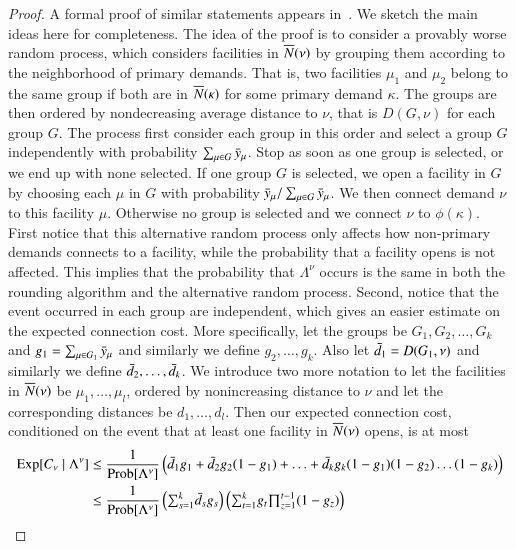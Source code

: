 \begin{proof}
  A formal proof of similar statements appears in~\cite{ChudakS04,
    ByrkaA10}. We sketch the main ideas here for completeness. The
  idea of the proof is to consider a provably worse random process,
  which considers facilities in ${\overline{N}}(\nu)$ by grouping them
  according to the neighborhood of primary demands. That is, two
  facilities $\mu_1$ and $\mu_2$ belong to the same group if both are
  in ${\overline{N}}(\kappa)$ for some primary demand $\kappa$. The groups are
  then ordered by nondecreasing average distance to $\nu$, that is
  $D(G,\nu)$ for each group $G$. The process first consider each group
  in this order and select a group $G$ independently with probability
  $\sum_{\mu\in G}{\bar y}_{\mu}$. Stop as soon as one group is selected,
  or we end up with none selected. If one group $G$ is selected, we
  open a facility in $G$ by choosing each $\mu$ in $G$ with
  probability ${\bar y}_{\mu}/\sum_{\mu\in G} {\bar y}_{\mu}$. We then
  connect demand $\nu$ to this facility $\mu$. Otherwise no group is
  selected and we connect $\nu$ to $\phi(\kappa)$. First notice that
  this alternative random process only affects how non-primary demands
  connects to a facility, while the probability that a facility opens
  is not affected. This implies that the probability that
  $\Lambda^\nu$ occurs is the same in both the rounding algorithm and
  the alternative random process. Second, notice that the event
  occurred in each group are independent, which gives an easier
  estimate on the expected connection cost. More specifically, let the
  groups be $G_1, G_2, \ldots, G_k$ and $g_1 = \sum_{\mu \in G_1}
  {\bar y}_{\mu}$ and similarly we define $g_2,\ldots,g_k$. Also let
  ${\bar d}_1 = D(G_1, \nu)$ and similarly we define ${\bar d}_2, \ldots,
  {\bar d}_k$. We introduce two more notation to let the facilities in
  ${\overline{N}}(\nu)$ be $\mu_1, \ldots, \mu_l$, ordered by nonincreasing
  distance to $\nu$ and let the corresponding distances be $d_1,
  \ldots, d_l$. Then our expected connection cost, conditioned on the
  event that at least one facility in ${\overline{N}}(\nu)$ opens, is at most
\begin{align*}
  \Exp[C_\nu \mid \Lambda^\nu] &\leq \frac{1}{\Prob[\Lambda^\nu]}
  \left( \bard_1 g_1 + \bard_2 g_2 (1-g_1) + \ldots + \bard_k g_k
    (1-g_1) (1-g_2) \ldots (1-g_k) \right)
  \\
  &\leq \frac{1}{\Prob[\Lambda^\nu]} \left(\textstyle{\sum_{s=1}^k} \bard_s
  g_s\right)
\left(\textstyle{\sum_{t=1}^k} g_t \textstyle{\prod_{z=1}^{t-1}}
  (1-g_z)\right)
  \\

\end{align*}
\end{proof}
